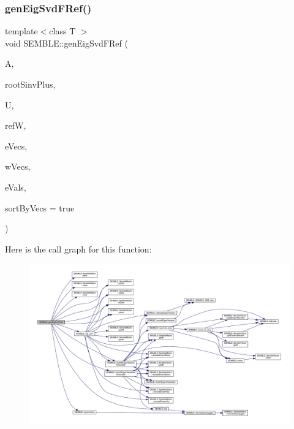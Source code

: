 \mbox{\label{namespaceSEMBLE_a9e560b53e88c45058e9898709cf084b3}} 
\subsubsection{\texorpdfstring{genEigSvdFRef()}{genEigSvdFRef()}\hspace{0.1cm}{\footnotesize\ttfamily [2/2]}}
{\footnotesize\ttfamily template$<$class T $>$ \\
void S\+E\+M\+B\+L\+E\+::gen\+Eig\+Svd\+F\+Ref (\begin{DoxyParamCaption}\item[{const \mbox{\hyperlink{structSEMBLE_1_1SembleMatrix}{Semble\+Matrix}}$<$ T $>$ \&}]{A,  }\item[{const \mbox{\hyperlink{structSEMBLE_1_1SembleMatrix}{Semble\+Matrix}}$<$ T $>$ \&}]{root\+Sinv\+Plus,  }\item[{const \mbox{\hyperlink{structSEMBLE_1_1SembleMatrix}{Semble\+Matrix}}$<$ T $>$ \&}]{U,  }\item[{const \mbox{\hyperlink{structSEMBLE_1_1SembleMatrix}{Semble\+Matrix}}$<$ T $>$ \&}]{refW,  }\item[{\mbox{\hyperlink{structSEMBLE_1_1SembleMatrix}{Semble\+Matrix}}$<$ T $>$ \&}]{e\+Vecs,  }\item[{\mbox{\hyperlink{structSEMBLE_1_1SembleMatrix}{Semble\+Matrix}}$<$ T $>$ \&}]{w\+Vecs,  }\item[{\mbox{\hyperlink{structSEMBLE_1_1SembleVector}{Semble\+Vector}}$<$ double $>$ \&}]{e\+Vals,  }\item[{const bool}]{sort\+By\+Vecs = {\ttfamily true} }\end{DoxyParamCaption})}

Here is the call graph for this function\+:
\nopagebreak
\begin{figure}[H]
\begin{center}
\leavevmode
\includegraphics[width=350pt]{d7/dfd/namespaceSEMBLE_a9e560b53e88c45058e9898709cf084b3_cgraph}
\end{center}
\end{figure}
\mbox{\label{namespaceSEMBLE_ad47fd10bab63a835bef0e6fa42868f83}} 
